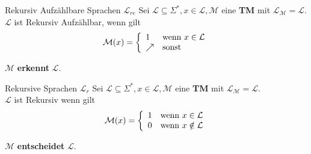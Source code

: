 \documentclass[]{beamer}
\begin{document}
\begin{frame}[<+->][squeeze]{}  
  \begin{block}{Rekursiv Aufzählbare Sprachen $\mathcal{L}_{re}$}
    Sei $\mathcal{L} \subseteq \Sigma^*, x \in \mathcal{L}, \mathcal{M}$ eine \textbf{TM} mit $\mathcal{L_M} = \mathcal{L}$. \\
    $\mathcal{L}$ ist Rekursiv Aufzählbar, wenn gilt
    \[\mathcal{M}(x) = \left\{\begin{array}{l l}
                                1        & $wenn $ x \in \mathcal{L} \\
                                \nearrow & $sonst$ \\
                              \end{array}\right.\]
    \begin{center}
      $\mathcal{M}$ \textbf{erkennt} $\mathcal{L}$.
    \end{center}
  \end{block}
  
  \begin{block}{Rekursive Sprachen $\mathcal{L}_r$}
    Sei $\mathcal{L} \subseteq \Sigma^*, x \in \mathcal{L}, \mathcal{M}$ eine \textbf{TM} mit $\mathcal{L_M} = \mathcal{L}$. \\
    $\mathcal{L}$ ist Rekursiv wenn gilt
    \[\mathcal{M}(x) = \left\{\begin{array}{l l}
                                1 & $wenn $ x \in \mathcal{L} \\
                                0 & $wenn $ x \notin \mathcal{L} \\
                              \end{array}\right.\]
    \begin{center}
      $\mathcal{M}$ \textbf{entscheidet} $\mathcal{L}$.
    \end{center}
  \end{block}
\end{frame}
\end{document}
